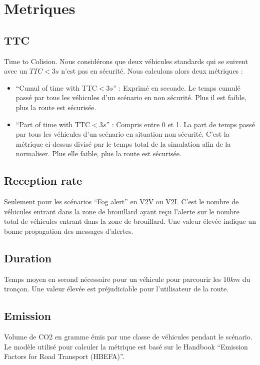 \documentclass[a4paper,10pt]{article}
\begin{document}
\section{Metriques}


\subsection{TTC}

Time to Colision. Nous considérons que deux véhicules standards qui se suivent avec un $TTC < 3 s$  n'est pas en sécurité. Nous calculons alors deux métriques :

\begin{itemize}
 \item ``Cumul of time with TTC$ < 3 s$'' : Exprimé en seconde. Le temps cumulé passé  par tous les véhicules d'un scénario en non sécurité. Plus il est faible, plus la route est sécurisée.
 \item ``Part of time with TTC$ < 3 s$'' : Compris entre 0 et 1. La part de temps passé  par tous les véhicules d'un scénario en situation non sécurité. C'est la métrique ci-dessus divisé par le temps total de la simulation afin de la normaliser. Plus elle faible, plus la route est sécurisée.
\end{itemize}

\subsection{Reception rate}

Seulement pour les scénarios ``Fog alert'' en V2V ou V2I. C'est le nombre de véhicules entrant dans la zone de brouillard ayant reçu l'alerte sur le nombre total de véhicules entrant dans la zone de brouillard. Une valeur élevée indique un bonne propagation des messages d'alertes.

\subsection{Duration}

Temps moyen en second nécessaire pour un véhicule pour parcourir les $10 km$ du tronçon. Une valeur élevée est préjudiciable pour l'utilisateur de la route.

\subsection{Emission}

Volume de CO2 en gramme émis par une classe de véhicules pendant le scénario. Le modèle utilisé pour calculer la métrique est basé sur le Handbook ``Emission Factors for Road Transport (HBEFA)''.
\end{document}
